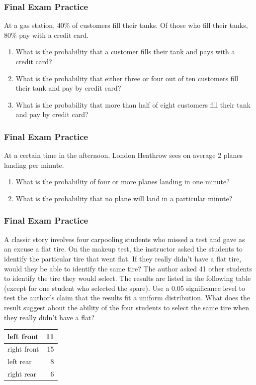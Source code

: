 \documentclass[xcolor=dvipsnames]{beamer}
\begin{document}
\begin{frame}
  \frametitle{Final Exam Practice}
  {\ubung} At a gas station, 40\% of customers fill their tanks. Of
  those who fill their tanks, 80\% pay with a credit card.
  \begin{enumerate}
  \item What is the probability that a customer fills their tank and
    pays with a credit card?
  \item What is the probability that either three or four out of ten
    customers fill their tank and pay by credit card?
  \item What is the probability that more than half of eight customers
    fill their tank and pay by credit card?
  \end{enumerate}
\end{frame}

\begin{frame}
  \frametitle{Final Exam Practice}
  {\ubung} At a certain time in the afternoon, London Heathrow sees on average 2
  planes landing per minute.
  \begin{enumerate}
  \item What is the probability of four or more planes landing in one
    minute?
  \item What is the probability that no plane will land in a
    particular minute?
  \end{enumerate}
\end{frame}

\begin{frame}
  \frametitle{Final Exam Practice}
  {\ubung} A classic story involves four carpooling students who
  missed a test and gave as an excuse a flat tire. On the makeup test,
  the instructor asked the students to identify the particular tire
  that went flat. If they really didn't have a flat tire, would they
  be able to identify the same tire? The author asked 41 other
  students to identify the tire they would select. The results are
  listed in the following table (except for one student who selected
  the spare). Use a 0.05 significance level to test the author's claim
  that the results fit a uniform distribution. What does the result
  suggest about the ability of the four students to select the same
  tire when they really didn't have a flat?

  \begin{tabular}{|l|r|}\hline
        left front  & 11 \\ \hline
        right front & 15 \\ \hline
        left rear   & 8  \\ \hline
        right rear  & 6  \\ \hline
  \end{tabular}
\end{frame}
\end{document}
